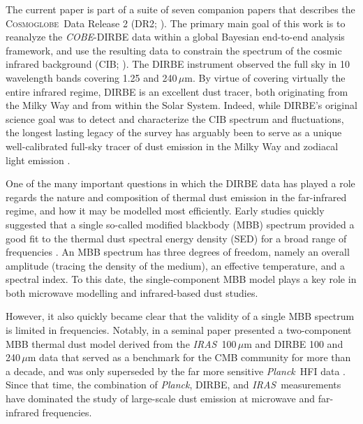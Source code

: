 \documentclass{aa}
\def\Cosmoglobe{\textsc{Cosmoglobe}}
\def\Planck{\textit{Planck}}
\def\COBE{\textit{COBE}}
\def\IRAS{\textit{{IRAS}}}
\begin{document}
The current paper is part of a suite of seven companion papers that
describes the \Cosmoglobe\ Data Release 2 (DR2; \citealp{CG02_01}). The
primary main goal of this work is to reanalyze the \COBE-DIRBE data
\citep{hauser1998} within a global Bayesian end-to-end analysis
framework, and use the resulting data to constrain the spectrum of the
cosmic infrared background (CIB; \citealp{CG02_03}). The DIRBE
instrument observed the full sky in 10 wavelength bands covering 1.25
and 240\,$\mu$m. By virtue of covering virtually the entire infrared
regime, DIRBE is an excellent dust tracer, both originating from the
Milky Way and from within the Solar System. Indeed, while DIRBE's
original science goal was to detect and characterize the CIB spectrum
and fluctuations, the longest lasting legacy of the survey has
arguably been to serve as a unique well-calibrated full-sky tracer of
dust emission in the Milky Way 
\citep{schlegel1998,IRIS,planck2014-a12,sano2016,pysm_methods}
and zodiacal
light emission \citep[e.g.,][]{K98,planck2013-pip88,2016AJ....151...71K,CG02_02,obrien2025}.%

One of the many important questions in which the DIRBE data has played a role
regards the nature and composition of thermal dust emission in the
far-infrared regime, and how it may be modelled most
efficiently. Early studies quickly suggested that a single so-called
modified blackbody (MBB) spectrum provided a good fit to the thermal
dust spectral energy density (SED) for a broad range of frequencies
\citep{reach1995b}. An MBB spectrum has three degrees of freedom, namely
an overall amplitude (tracing the density of the medium), an effective
temperature, and a spectral index. To this date, the
single-component MBB model plays a key role in both microwave
modelling and infrared-based dust studies.

However, it also quickly became clear that the validity of a single
MBB spectrum is limited in frequencies. Notably, in a seminal paper \citet{finkbeiner:1999} presented a two-component
MBB thermal dust model derived from the \IRAS\ 100\,$\mu$m and DIRBE 100
and 240\,$\mu$m data that served as a benchmark for the CMB community for more than a decade, and was
only superseded by the far more sensitive \Planck\ HFI data
\citep{planck2013-p06b}. Since that time, the combination of
\Planck, DIRBE, and \IRAS\ measurements have dominated the study of
large-scale dust emission at microwave and far-infrared frequencies.
\end{document}
